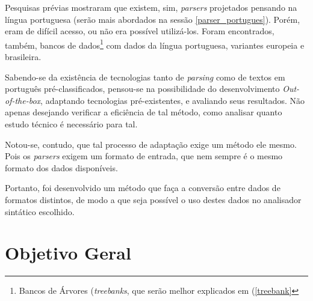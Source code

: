 Pesquisas prévias mostraram que existem, sim, \textit{parsers} projetados pensando na língua portuguesa (serão mais abordados na sessão \ref{parser_portugues}). Porém, eram de difícil acesso, ou não era possível utilizá-los. Foram encontrados, também, bancos de dados\footnote{Bancos de Árvores (\textit{treebanks}, que serão melhor explicados em (\ref{treebank}} com dados da língua portuguesa, variantes europeia e brasileira.

Sabendo-se da existência de tecnologias tanto de \textit{parsing} como de textos em português pré-classificados, pensou-se na possibilidade do desenvolvimento \textit{Out-of-the-box}, adaptando tecnologias pré-existentes, e avaliando seus resultados. Não apenas desejando verificar a eficiência de tal método, como analisar quanto estudo técnico é necessário para tal.

Notou-se, contudo, que tal processo de adaptação exige um método ele mesmo. Pois os \textit{parsers} exigem um formato de entrada, que nem sempre é o mesmo formato dos dados disponíveis.

Portanto, foi desenvolvido um método que faça a conversão entre dados de formatos distintos, de modo a que seja possível o uso destes dados no analisador sintático escolhido.




\section{Objetivo Geral}
\label{sec:objetivos-gerais}


